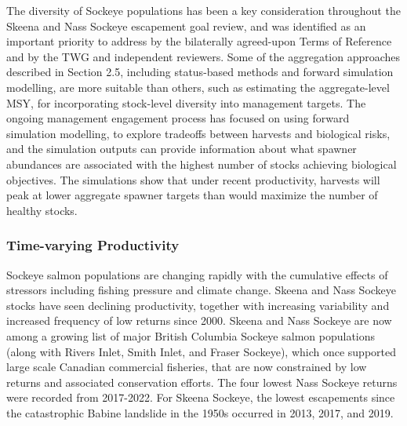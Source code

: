 \documentclass[french,11pt]{book}
\begin{document}
The diversity of Sockeye populations has been a key consideration throughout the Skeena and Nass Sockeye escapement goal review, and was identified as an important priority to address by the bilaterally agreed-upon Terms of Reference and by the TWG and independent reviewers. Some of the aggregation approaches described in Section 2.5, including status-based methods and forward simulation modelling, are more suitable than others, such as estimating the aggregate-level MSY, for incorporating stock-level diversity into management targets. The ongoing management engagement process has focused on using forward simulation modelling, to explore tradeoffs between harvests and biological risks, and the simulation outputs can provide information about what spawner abundances are associated with the highest number of stocks achieving biological objectives. The simulations show that under recent productivity, harvests will peak at lower aggregate spawner targets than would maximize the number of healthy stocks.

\subsubsection{Time-varying Productivity}\label{ImportantTimeVar}

Sockeye salmon populations are changing rapidly with the cumulative effects of stressors including fishing pressure and climate change. Skeena and Nass Sockeye stocks have seen declining productivity, together with increasing variability and increased frequency of low returns since 2000. Skeena and Nass Sockeye are now among a growing list of major British Columbia Sockeye salmon populations (along with Rivers Inlet, Smith Inlet, and Fraser Sockeye), which once supported large scale Canadian commercial fisheries, that are now constrained by low returns and associated conservation efforts. The four lowest Nass Sockeye returns were recorded from 2017-2022. For Skeena Sockeye, the lowest escapements since the catastrophic Babine landslide in the 1950s occurred in 2013, 2017, and 2019.
\end{document}
